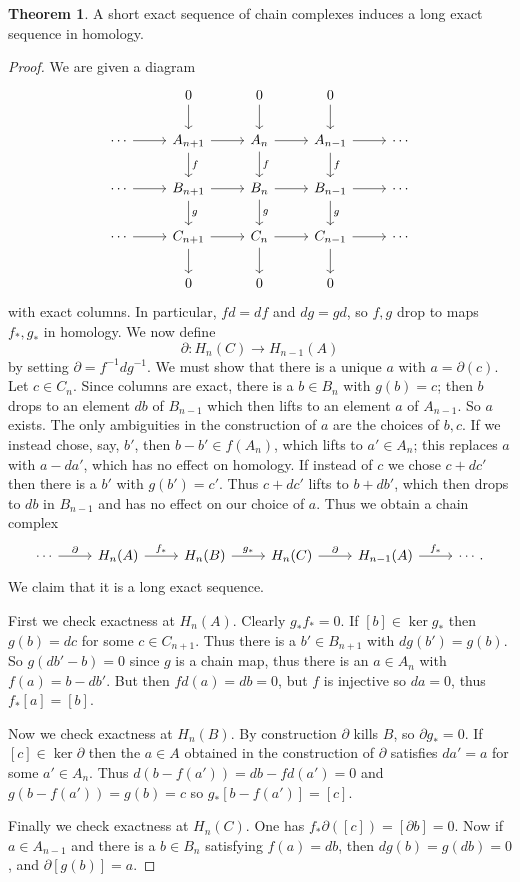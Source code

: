\documentclass[10pt]{article}
\theoremstyle{definition}
\newtheorem{theorem}[lemma]{Theorem}
\begin{document}
\begin{theorem}
A short exact sequence of chain complexes induces a long exact sequence in homology.
\end{theorem}
\begin{proof}
We are given a diagram
$$\begin{tikzcd}
& 0 \arrow[d] & 0 \arrow[d] & 0 \arrow[d] \\
\cdots \arrow[r] & A_{n+1} \arrow[d,"f"] \arrow[r] & A_n \arrow[d,"f"] \arrow[r] & A_{n-1} \arrow[d,"f"] \arrow[r]&\cdots \\
\cdots \arrow[r] & B_{n+1} \arrow[d,"g"] \arrow[r] & B_n \arrow[d,"g"] \arrow[r] & B_{n-1} \arrow[d,"g"] \arrow[r]&\cdots \\
\cdots \arrow[r] & C_{n+1} \arrow[d] \arrow[r] & C_n \arrow[d] \arrow[r] & C_{n-1} \arrow[r] \arrow[d]&\cdots \\
& 0 & 0 & 0
\end{tikzcd}$$
with exact columns. In particular, $fd = df$ and $dg = gd$, so $f,g$ drop to maps $f_*,g_*$ in homology.
We now define
$$\partial: H_n(C) \to H_{n-1}(A)$$
by setting $\partial = f^{-1}dg^{-1}$.
We must show that there is a unique $a$ with $a = \partial(c)$.
Let $c \in C_n$.
Since columns are exact, there is a $b \in B_n$ with $g(b) = c$; then $b$ drops to an element $db$ of $B_{n-1}$ which then lifts to an element $a$ of $A_{n-1}$.
So $a$ exists. The only ambiguities in the construction of $a$ are the choices of $b,c$.
If we instead chose, say, $b'$, then $b - b' \in f(A_n)$, which lifts to $a' \in A_n$; this replaces $a$ with $a - da'$, which has no effect on homology.
If instead of $c$ we chose $c + dc'$ then there is a $b'$ with $g(b') = c'$. Thus $c + dc'$ lifts to $b + db'$, which then drops to $db$ in $B_{n-1}$ and has no effect on our choice of $a$.
Thus we obtain a chain complex
$$\begin{tikzcd}
\cdots \arrow[r,"\partial"] & H_n(A) \arrow[r,"f_*"] & H_n(B) \arrow[r,"g_*"] & H_n(C) \arrow[r,"\partial"] & H_{n-1}(A) \arrow[r,"f_*"] & \cdots.
\end{tikzcd}$$
We claim that it is a long exact sequence.

First we check exactness at $H_n(A)$. Clearly $g_*f_* = 0$.
If $[b] \in \ker g_*$ then $g(b) = dc$ for some $c \in C_{n+1}$.
Thus there is a $b' \in B_{n+1}$ with $dg(b') = g(b)$.
So $g(db' - b) = 0$ since $g$ is a chain map, thus there is an $a \in A_n$ with $f(a) = b - db'$.
But then $fd(a) = db = 0$, but $f$ is injective so $da = 0$, thus $f_*[a] = [b]$.

Now we check exactness at $H_n(B)$. By construction $\partial$ kills $B$, so $\partial g_* = 0$.
If $[c] \in \ker \partial$ then the $a \in A$ obtained in the construction of $\partial$ satisfies $da' = a$ for some $a' \in A_n$.
Thus $d(b - f(a')) = db - fd(a') = 0$ and $g(b - f(a')) = g(b) = c$ so $g_*[b - f(a')] = [c]$.

Finally we check exactness at $H_n(C)$. One has $f_*\partial ([c]) = [\partial b] = 0$.
Now if $a \in A_{n-1}$ and there is a $b \in B_n$ satisfying $f(a) = db$, then $dg(b) = g(db) = 0$, and $\partial[g(b)] = a$.
\end{proof}
\end{document}
